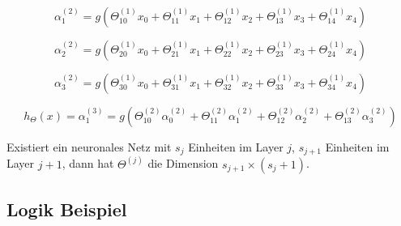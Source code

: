 \begin{flushleft}




$$ \alpha_{1}^{(2)} = g(\Theta_{10}^{(1)}x_{0} +  \Theta_{11}^{(1)}x_{1} + \Theta_{12}^{(1)}x_{2} +\Theta_{13}^{(1)}x_{3} + \Theta_{14}^{(1)}x_{4})$$

$$ \alpha_{2}^{(2)} = g(\Theta_{20}^{(1)}x_{0} +  \Theta_{21}^{(1)}x_{1} + \Theta_{22}^{(1)}x_{2} +\Theta_{23}^{(1)}x_{3} + \Theta_{24}^{(1)}x_{4})$$

$$ \alpha_{3}^{(2)} = g(\Theta_{30}^{(1)}x_{0} +  \Theta_{31}^{(1)}x_{1} + \Theta_{32}^{(1)}x_{2} +\Theta_{33}^{(1)}x_{3} + \Theta_{34}^{(1)}x_{4})$$


$$ h_{\Theta}(x) = \alpha_{1}^{(3)} = g(\Theta_{10}^{(2)}\alpha_{0}^{(2)} + \Theta_{11}^{(2)}\alpha_{1}^{(2)} + \Theta_{12}^{(2)}\alpha_{2}^{(2)} + \Theta_{13}^{(2)}\alpha_{3}^{(2)}) $$


Existiert ein neuronales Netz mit $s_{j}$ Einheiten im Layer $j$, $s_{j+1}$ Einheiten im Layer $j+1$, dann hat $\Theta^{(j)}$ die Dimension $s_{j+1} \times (s_{j} + 1)$.

\end{flushleft}


\subsection{Logik Beispiel}

